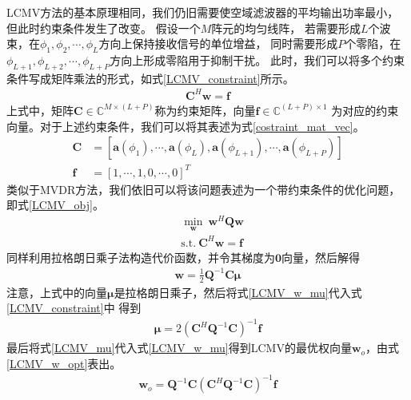 \documentclass[master]{thesis-uestc}
\begin{document}
LCMV方法的基本原理相同，我们仍旧需要使空域滤波器的平均输出功率最小，但此时约束条件发生了改变。
假设一个$M$阵元的均匀线阵，
若需要形成$L$个波束，在$\phi_1,\phi_2,\cdots,\phi_L$方向上保持接收信号的单位增益，
同时需要形成$P$个零陷，在$\phi_{L+1},\phi_{L+2},\cdots,\phi_{L+P}$方向上形成零陷用于抑制干扰。
此时，我们可以将多个约束条件写成矩阵乘法的形式，如式\eqref{LCMV_constraint}所示。
\begin{equation}\label{LCMV_constraint}
    \begin{aligned}
        \bm{C}^H\bm{w} = \bm{f}
    \end{aligned}
\end{equation}
上式中，矩阵$\bm{C}\in\mathbb{C}^{M\times(L+P)}$称为约束矩阵，向量$\bm{f}\in\mathbb{C}^{(L+P)\times1}$
为对应的约束向量。对于上述约束条件，我们可以将其表述为式\eqref{costraint_mat_vec}。
\begin{subequations}\label{costraint_mat_vec}
    \begin{align}
        \bm{C} &= \left[\bm{a}(\phi_1), \cdots, \bm{a}(\phi_L), 
                        \bm{a}(\phi_{L+1}), \cdots, \bm{a}(\phi_{L+P})\right]
        \\
        \bm{f} &= \left[1, \cdots, 1, 0, \cdots, 0\right]^T
    \end{align}
\end{subequations}
类似于MVDR方法，我们依旧可以将该问题表述为一个带约束条件的优化问题，即式\eqref{LCMV_obj}。
\begin{equation}\label{LCMV_obj}
    \begin{aligned}
        &\min_\bm{w} ~ \bm{w}^H\bm{Q}\bm{w} \\
        &\text{s.t.} ~ \bm{C}^H\bm{w} = \bm{f}
    \end{aligned}
\end{equation}
同样利用拉格朗日乘子法构造代价函数，并令其梯度为$\textbf{0}$向量，然后解得
\begin{equation}\label{LCMV_w_mu}
    \begin{aligned}
    \bm{w} = \frac{1}{2}\bm{Q}^{-1}\bm{C}\bm{\mu}
    \end{aligned}
\end{equation}
注意，上式中的向量$\bm{\mu}$是拉格朗日乘子，然后将式\eqref{LCMV_w_mu}代入式\eqref{LCMV_constraint}中
得到
\begin{equation}\label{LCMV_mu}
    \begin{aligned}
        \bm{\mu} = 2\left(\bm{C}^H\bm{Q}^{-1}\bm{C}\right)^{-1}\bm{f}
    \end{aligned}
\end{equation}
最后将式\eqref{LCMV_mu}代入式\eqref{LCMV_w_mu}得到LCMV的最优权向量$\bm{w}_o$，由式\eqref{LCMV_w_opt}表出。
\begin{equation}\label{LCMV_w_opt}
    \begin{aligned}
        \bm{w}_o = \bm{Q}^{-1}\bm{C}\left(\bm{C}^H\bm{Q}^{-1}\bm{C}\right)^{-1}\bm{f}
    \end{aligned}
\end{equation}
\end{document}
